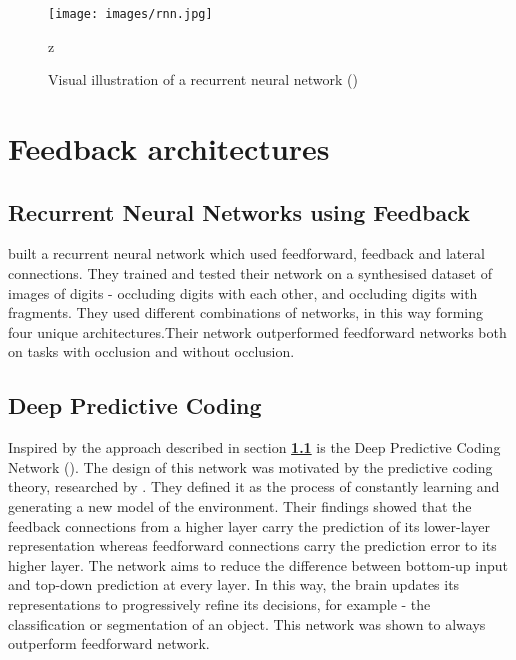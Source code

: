 \documentclass{l4proj}
\begin{document}
\begin{figure}[htb]
    \centering
    \texttt{[image: images/rnn.jpg]}    

    z\caption{Visual illustration of a recurrent neural network (\cite{rnngraph})} %

    \label{fig:rnn} 
\end{figure}


\section{Feedback architectures}
\subsection{Recurrent Neural Networks using Feedback}
\label{recfeedback}
\cite{feedbackrnn} built a recurrent neural network which used feedforward, feedback and lateral connections. They trained and tested their network on a synthesised dataset of images of digits - occluding digits with each other, and occluding digits with fragments. They used different combinations of networks, in this way forming four unique architectures.Their network outperformed feedforward networks both on tasks with occlusion and without occlusion.

\subsection{Deep Predictive Coding}
Inspired by the approach described in section \textbf{\ref{recfeedback}} is the Deep Predictive Coding Network (\cite{deeppcn}). The design of this network was motivated by the predictive coding theory, researched by \cite{predcod}. They defined it as the process of constantly learning and generating a new model of the environment. Their findings showed that the feedback connections from a higher layer carry the prediction of its lower-layer representation whereas feedforward connections carry the prediction error to its higher layer. The network aims to reduce the difference between bottom-up input and top-down prediction at every layer. In this way, the brain updates its representations to progressively refine its decisions, for example - the classification or segmentation of an object. This network was shown to always outperform feedforward network.
\end{document}
